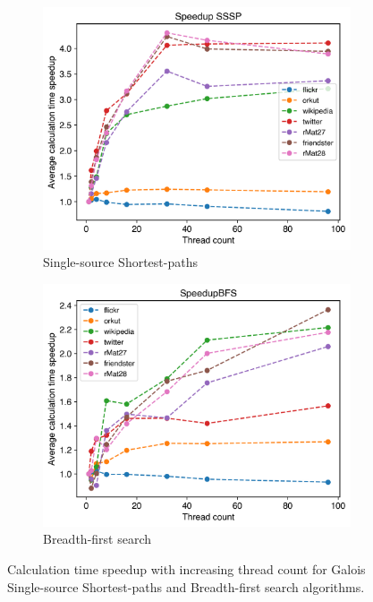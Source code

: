 \begin{figure}
	\begin{subfigure}{\columnwidth}
		\includegraphics[width=\linewidth]{../../plots/singleNodeSSSPGaloisThreads.png}
		\caption{Single-source Shortest-paths}
		\label{fig:singleNodeSSSPGaloisThreads}
	\end{subfigure}
	\begin{subfigure}{\columnwidth}
		\includegraphics[width=\linewidth]{../../plots/singleNodeBFSGaloisThreads.png}
		\caption{Breadth-first search}
		\label{fig:singleNodeBFSGaloisThreads}
	\end{subfigure}
	\caption{Calculation time speedup with increasing thread count for Galois Single-source Shortest-paths and Breadth-first search algorithms.}
\end{figure}



